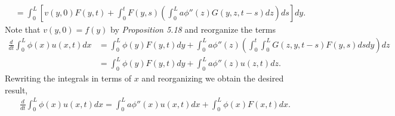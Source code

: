 \begin{questions}
\begin{solution}
\begin{align*}
&=\int_0^L\left[v(y,0)F(y,t)+\int_0^tF(y,s)\left(\int_0^La\phi''(z)G(y,z,t-s)dz\right)ds\right]dy.
\end{align*}
Note that $v(y,0)=f(y)$ by \textsl{Proposition 5.18} and reorganize the terms
\begin{align*}
\frac{d}{dt}\int_0^L\phi(x)u(x,t)dx&=\int_0^L\phi(y)F(y,t)dy+\int_0^La\phi''(z)
\left(\int_0^t\int_0^LG(z,y,t-s)F(y,s)dsdy\right)dz\\
&=\int_0^L\phi(y)F(y,t)dy+\int_0^La\phi''(z)u(z,t)dz.
\end{align*}
Rewriting the integrals in terms of $x$ and reorganizing we obtain the desired result,
\begin{align*}
\frac{d}{dt}\int_0^L\phi(x)u(x,t)dx=\int_0^La\phi''(x)u(x,t)dx+\int_0^L\phi(x)F(x,t)dx.
\end{align*}

\end{solution}
\end{questions}